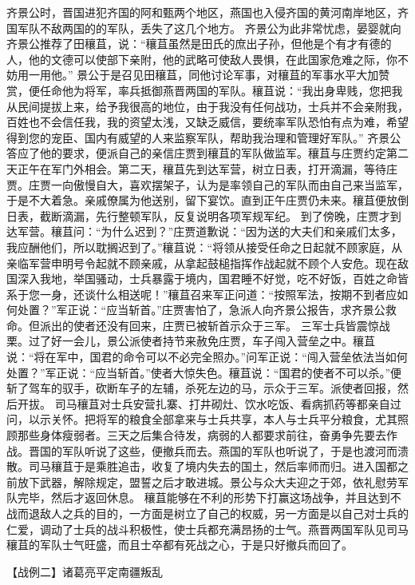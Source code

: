 \documentclass[a4paper,12pt,UTF8,twoside]{ctexbook}
\begin{document}
齐景公时，晋国进犯齐国的阿和甄两个地区，燕国也入侵齐国的黄河南岸地区，齐国军队不敌两国的的军队，丢失了这几个地方。
齐景公为此非常忧虑，晏婴就向齐景公推荐了田穰苴，说：“穰苴虽然是田氏的庶出子孙，但他是个有才有德的人，他的文德可以使部下亲附，他的武略可使敌人畏惧，在此国家危难之际，你不妨用一用他。”
景公于是召见田穰苴，同他讨论军事，对穰苴的军事水平大加赞赏，便任命他为将军，率兵抵御燕晋两国的军队。穰苴说：“我出身卑贱，您把我从民间提拔上来，给予我很高的地位，由于我没有任何战功，士兵并不会亲附我，百姓也不会信任我，我的资望太浅，又缺乏威信，要统率军队恐怕有点为难，希望得到您的宠臣、国内有威望的人来监察军队，帮助我治理和管理好军队。”
齐景公答应了他的要求，便派自己的亲信庄贾到穰苴的军队做监军。穰苴与庄贾约定第二天正午在军门外相会。第二天，穰苴先到达军营，树立日表，打开滴漏，等待庄贾。庄贾一向傲慢自大，喜欢摆架子，认为是率领自己的军队而由自己来当监军，于是不大着急。亲戚僚属为他送别，留下宴饮。直到正午庄贾仍未来。穰苴便放倒日表，截断滴漏，先行整顿军队，反复说明各项军规军纪。
到了傍晚，庄贾才到达军营。穰苴问：“为什么迟到？”庄贾道歉说：“因为送的大夫们和亲戚们太多，我应酬他们，所以耽搁迟到了。”穰苴说：“将领从接受任命之日起就不顾家庭，从亲临军营申明号令起就不顾亲戚，从拿起鼓槌指挥作战起就不顾个人安危。现在敌国深入我地，举国骚动，士兵暴露于境内，国君睡不好觉，吃不好饭，百姓之命皆系于您一身，还谈什么相送呢！”穰苴召来军正问道：“按照军法，按期不到者应如何处置？”军正说：“应当斩首。”庄贾害怕了，急派人向齐景公报告，求齐景公救命。但派出的使者还没有回来，庄贾已被斩首示众于三军。
三军士兵皆震惊战栗。过了好一会儿，景公派使者持节来赦免庄贾，车子闯入营垒之中。穰苴说：“将在军中，国君的命令可以不必完全照办。”问军正说：“闯入营垒依法当如何处置？”军正说：“应当斩首。”使者大惊失色。穰苴说：“国君的使者不可以杀。”便斩了驾车的驭手，砍断车子的左辅，杀死左边的马，示众于三军。派使者回报，然后开拔。
司马穰苴对士兵安营扎寨、打井砌灶、饮水吃饭、看病抓药等都亲自过问，以示关怀。把将军的粮食全部拿来与士兵共享，本人与士兵平分粮食，尤其照顾那些身体瘦弱者。三天之后集合待发，病弱的人都要求前往，奋勇争先要去作战。晋国的军队听说了这些，便撤兵而去。燕国的军队也听说了，于是也渡河而溃散。司马穰苴于是乘胜追击，收复了境内失去的国土，然后率师而归。进入国都之前放下武器，解除规定，盟誓之后才敢进城。景公与众大夫迎之于郊，依礼慰劳军队完毕，然后才返回休息。
穰苴能够在不利的形势下打赢这场战争，并且达到不战而退敌人之兵的目的，一方面是树立了自己的权威，另一方面是以自己对士兵的仁爱，调动了士兵的战斗积极性，使士兵都充满昂扬的士气。燕晋两国军队见司马穰苴的军队士气旺盛，而且士卒都有死战之心，于是只好撤兵而回了。


【战例二】诸葛亮平定南疆叛乱
\end{document}
